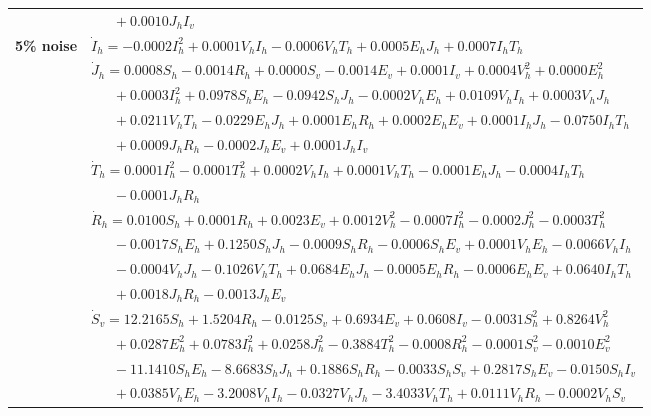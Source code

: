 \documentclass[9pt]{article}
\numberwithin{equation}{section}
\begin{document}
\begin{table}[ht]
\begin{tabularx}{1\linewidth}{|l|X|}
        & $\quad\;\;+0.0010J_hI_v$ \\
        \textbf{5\% noise} & $\dot{I}_h=-0.0002I_h^2+0.0001V_hI_h-0.0006V_hT_h+0.0005E_hJ_h+0.0007I_hT_h$ \\
        & $\dot{J}_h=0.0008S_h-0.0014R_h+0.0000S_v-0.0014E_v+0.0001I_v+0.0004V_h^2+0.0000E_h^2$ \\
        & $\quad\;\;+0.0003I_h^2+0.0978S_hE_h-0.0942S_hJ_h-0.0002V_hE_h+0.0109V_hI_h+0.0003V_hJ_h$ \\
        & $\quad\;\;+0.0211V_hT_h-0.0229E_hJ_h+0.0001E_hR_h+0.0002E_hE_v+0.0001I_hJ_h-0.0750I_hT_h$ \\
        & $\quad\;\;+0.0009J_hR_h-0.0002J_hE_v+0.0001J_hI_v$ \\
        & $\dot{T}_h=0.0001I_h^2-0.0001T_h^2+0.0002V_hI_h+0.0001V_hT_h-0.0001E_hJ_h-0.0004I_hT_h$ \\
        & $\quad\;\;-0.0001J_hR_h$ \\
        & $\dot{R}_h=0.0100S_h+0.0001R_h+0.0023E_v+0.0012V_h^2-0.0007I_h^2-0.0002J_h^2-0.0003T_h^2$ \\
        & $\quad\;\;-0.0017S_hE_h+0.1250S_hJ_h-0.0009S_hR_h-0.0006S_hE_v+0.0001V_hE_h-0.0066V_hI_h$ \\
        & $\quad\;\;-0.0004V_hJ_h-0.1026V_hT_h+0.0684E_hJ_h-0.0005E_hR_h-0.0006E_hE_v+0.0640I_hT_h$ \\
        & $\quad\;\;+0.0018J_hR_h-0.0013J_hE_v$ \\
        & $\dot{S}_v=12.2165S_h+1.5204R_h-0.0125S_v+0.6934E_v+0.0608I_v-0.0031S_h^2+0.8264V_h^2$ \\
        & $\quad\;\;+0.0287E_h^2+0.0783I_h^2+0.0258J_h^2-0.3884T_h^2-0.0008R_h^2-0.0001S_v^2-0.0010E_v^2$ \\
        & $\quad\;\;-11.1410S_hE_h-8.6683S_hJ_h+0.1886S_hR_h-0.0033S_hS_v+0.2817S_hE_v-0.0150S_hI_v$ \\
        & $\quad\;\;+0.0385V_hE_h-3.2008V_hI_h-0.0327V_hJ_h-3.4033V_hT_h+0.0111V_hR_h-0.0002V_hS_v$ \\
    \end{tabularx}
\end{table}
\end{document}
